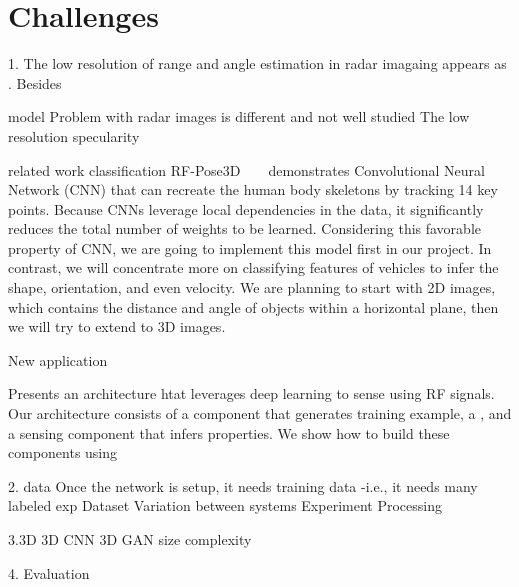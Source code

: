 \section{Challenges}
1. 
The low resolution of range and angle estimation in radar imagaing appears as . Besides
 
model
Problem with radar images is different and not well studied 
	The low resolution
	specularity 

related work classification
 RF-Pose3D ~\cite{rfpose} ~\cite{rfpose3D} demonstrates Convolutional Neural Network (CNN) that can recreate the human body skeletons by tracking 14 key points. Because CNNs leverage local dependencies in the data, it significantly reduces the total number of weights to be learned. Considering this favorable property of CNN, we are going to implement this model first in our project. In contrast, we will concentrate more on classifying features of vehicles to infer the shape, orientation, and even velocity. We are planning to start with 2D images, which contains the distance and angle of objects within a horizontal plane, then we will try to extend to 3D images.
	
New application 


Presents an architecture htat leverages deep learning to sense using RF signals. Our architecture consists of a component that generates training example, a , and a sensing component that infers properties. We show how to build these components using 


2. data
Once the network is setup, it needs training data -i.e., it needs many labeled exp
Dataset
	Variation between systems 
	Experiment
	Processing

3.3D
3D CNN %
3D GAN size complexity

4. 
Evaluation



